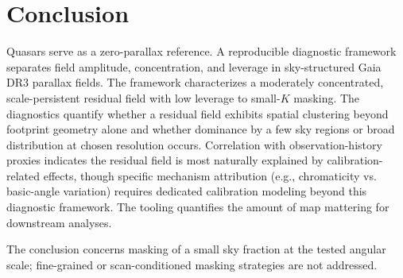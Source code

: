 \section{Conclusion}

Quasars serve as a zero-parallax reference. A reproducible diagnostic framework separates field amplitude, concentration, and leverage in sky-structured Gaia DR3 parallax fields. The framework characterizes a moderately concentrated, scale-persistent residual field with low leverage to small-$K$ masking. The diagnostics quantify whether a residual field exhibits spatial clustering beyond footprint geometry alone and whether dominance by a few sky regions or broad distribution at chosen resolution occurs. Correlation with observation-history proxies indicates the residual field is most naturally explained by calibration-related effects, though specific mechanism attribution (e.g., chromaticity vs. basic-angle variation) requires dedicated calibration modeling beyond this diagnostic framework. The tooling quantifies the amount of map mattering for downstream analyses.

The conclusion concerns masking of a small sky fraction at the tested angular scale; fine-grained or scan-conditioned masking strategies are not addressed.


